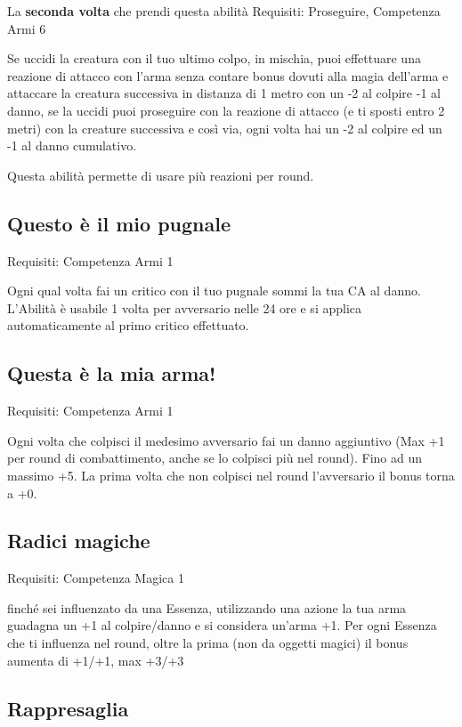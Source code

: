 \documentclass[a4paper,11pt,twoside,openany]{book}
\begin{document}
La \textbf{seconda volta} che prendi questa abilità Requisiti: Proseguire, Competenza Armi 6

Se uccidi la creatura con il tuo ultimo colpo, in mischia, puoi effettuare una reazione di attacco con l'arma senza contare bonus dovuti alla magia dell'arma e attaccare la creatura successiva in distanza di 1 metro con un -2 al colpire -1 al danno, se la uccidi puoi proseguire con la reazione di attacco (e ti sposti entro 2 metri) con la creature successiva e così via, ogni volta hai un -2 al colpire ed un -1 al danno cumulativo.

Questa abilità permette di usare più reazioni per round.

\subsection{Questo è il mio pugnale}

Requisiti: Competenza Armi 1

Ogni qual volta fai un critico con il tuo pugnale sommi la tua CA al danno. L'Abilità è usabile 1 volta per avversario nelle 24 ore e si applica automaticamente al primo critico effettuato.

\subsection{Questa è la mia arma!}

Requisiti: Competenza Armi 1

Ogni volta che colpisci il medesimo avversario fai un danno aggiuntivo (Max +1 per round di combattimento, anche se lo colpisci più nel round). Fino ad un massimo +5. La prima volta che non colpisci nel round l'avversario il bonus torna a +0.

\subsection{Radici magiche}

Requisiti: Competenza Magica 1

finché sei influenzato da una Essenza, utilizzando una azione la tua arma guadagna un +1 al colpire/danno e si considera un'arma +1. Per ogni Essenza che ti influenza nel round, oltre la prima (non da oggetti magici) il bonus aumenta di +1/+1, max +3/+3

\subsection{Rappresaglia}
\end{document}
